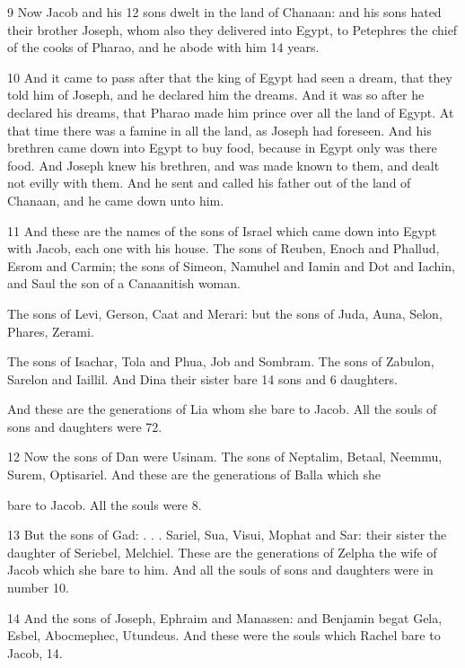 \par 9 Now Jacob and his 12 sons dwelt in the land of Chanaan: and his sons hated their brother Joseph, whom also they delivered into Egypt, to Petephres the chief of the cooks of Pharao, and he abode with him 14 years.

\par 10 And it came to pass after that the king of Egypt had seen a dream, that they told him of Joseph, and he declared him the dreams. And it was so after he declared his dreams, that Pharao made him prince over all the land of Egypt. At that time there was a famine in all the land, as Joseph had foreseen. And his brethren came down into Egypt to buy food, because in Egypt only was there food. And Joseph knew his brethren, and was made known to them, and dealt not evilly with them. And he sent and called his father out of the land of Chanaan, and he came down unto him.

\par 11 And these are the names of the sons of Israel which came down into Egypt with Jacob, each one with his house. The sons of Reuben, Enoch and Phallud, Esrom and Carmin; the sons of Simeon, Namuhel and Iamin and Dot and Iachin, and Saul the son of a Canaanitish woman.

\par The sons of Levi, Gerson, Caat and Merari: but the sons of Juda, Auna, Selon, Phares, Zerami.

\par The sons of Isachar, Tola and Phua, Job and Sombram. The sons of Zabulon, Sarelon and Iaillil. And Dina their sister bare 14 sons and 6 daughters.

\par And these are the generations of Lia whom she bare to Jacob. All the souls of sons and daughters were 72.

\par 12 Now the sons of Dan were Usinam. The sons of Neptalim, Betaal, Neemmu, Surem, Optisariel. And these are the generations of Balla which she 
\par bare to Jacob. All the souls were 8.

\par 13 But the sons of Gad: . . . Sariel, Sua, Visui, Mophat and Sar: their sister the daughter of Seriebel, Melchiel. These are the generations of Zelpha the wife of Jacob which she bare to him. And all the souls of sons and daughters were in number 10.

\par 14 And the sons of Joseph, Ephraim and Manassen: and Benjamin begat Gela, Esbel, Abocmephec, Utundeus. And these were the souls which Rachel bare to Jacob, 14.

